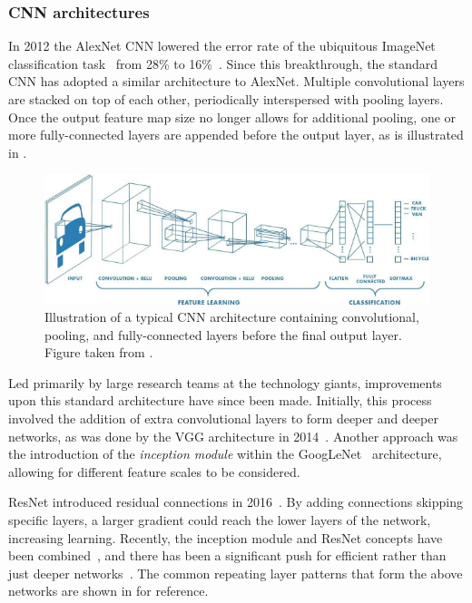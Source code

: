 \subsubsection*{CNN architectures} %

In 2012 the AlexNet CNN lowered the error rate of the ubiquitous ImageNet classification
task~\cite{deng2009} from 28\% to 16\%~\cite{krizhevsky2012}. Since this breakthrough, the
standard CNN has adopted a similar architecture to AlexNet. Multiple convolutional layers are
stacked on top of each other, periodically interspersed with pooling layers. Once the output
feature map size no longer allows for additional pooling, one or more fully-connected layers are
appended before the output layer, as is illustrated in .

\begin{figure} %
    \includegraphics[width=\textwidth]{diagrams/6-cnn/conv_diagram.pdf}
    \caption[Illustration of a typical Convolutional Neural Network architecture]
    {Illustration of a typical CNN architecture containing convolutional, pooling, and
        fully-connected layers before the final output layer. Figure taken from
        .}
    \label{fig:conv_diagram}
\end{figure}

Led primarily by large research teams at the technology giants, improvements upon this standard
architecture have since been made. Initially, this process involved the addition of extra
convolutional layers to form deeper and deeper networks, as was done by the VGG architecture in
2014~\cite{simonyan2014}. Another approach was the introduction of the \emph{inception module}
within the GoogLeNet~\cite{szegedy2015} architecture, allowing for different feature scales to be
considered.

ResNet introduced residual connections in 2016~\cite{he2016_original, he2016_improved}. By adding
connections skipping specific layers, a larger gradient could reach the lower layers of the
network, increasing learning. Recently, the inception module and ResNet concepts have been
combined~\cite{szegedy2016}, and there has been a significant push for efficient rather than just
deeper networks~\cite{sandler2018, tan2019}. The common repeating layer patterns that form the
above networks are shown in  for reference.

